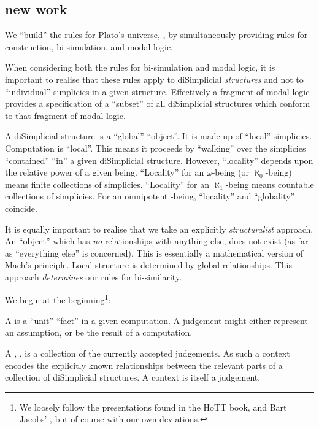 \documentclass[a4paper,openany]{amsbook}
\begin{document}
\subsection{new work}

We ``build'' the rules for Plato's universe, \Universe, by simultaneously providing rules
for construction, bi-simulation, and modal logic.

When considering both the rules for bi-simulation and modal logic, it is important to
realise that these rules apply to diSimplicial \emph{structures} and not to ``individual''
simplicies in a given structure. Effectively a fragment of modal logic provides a
specification of a ``subset'' of all diSimplicial structures which conform to that
fragment of modal logic.

A diSimplicial structure is a ``global'' ``object''.  It is made up of ``local'' simplicies. 
Computation is ``local''. This means it proceeds by ``walking'' over the simplicies 
``contained'' ``in'' a given diSimplicial structure. However, ``locality'' depends upon the 
relative power of a given being. ``Locality'' for an $\omega$-being (or $\aleph_0$-being) 
means finite collections of simplicies. ``Locality'' for an $\aleph_1$-being means countable 
collections of simplicies. For an omnipotent \Cardinal-being, ``locality'' and ``globality'' 
coincide.

It is equally important to realise that we take an explicitly \emph{structuralist}
approach. An ``object'' which has \emph{no} relationships with anything else, does not
exist (as far as ``everything else'' is concerned). This is essentially a mathematical 
version of Mach's principle. Local structure is determined by global relationships.  This 
approach \emph{determines} our rules for bi-similarity.

We begin at the beginning\footnote{We loosely follow the presentations found in the HoTT
book, \cite[Appendix A2]{ufp2013hott} and Bart Jacobs' \cite{jacobs1999catLogicTypeTh},
but of course with our own deviations.}:

A  is a ``unit'' ``fact'' in a given computation. A judgement might 
either represent an assumption, or be the result of a computation.

A , \cJudgement{\Gamma}, is a collection of the currently accepted
judgements. As such a context encodes the explicitly known relationships between the
relevant parts of a collection of diSimplicial structures. A context is itself a
judgement.
\end{document}
